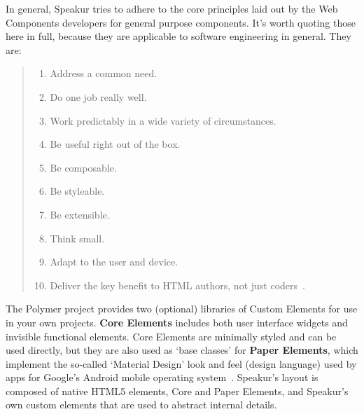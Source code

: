 In general, Speakur tries to adhere to the core principles laid out by the 
Web Components developers 
for general purpose components. 
It's worth quoting those here in full, 
because they are applicable to software engineering in general. They are:
\label{sec:wcprinciples}
\begin{quote}
\begin{enumerate}
\item Address a common need.\label{wcp:commonneed}
\item Do one job really well.\label{wcp:onejob}
\item Work predictably in a wide variety of circumstances.\label{wcp:predicatable}
\item Be useful right out of the box.\label{wcp:useful}
\item Be composable.\label{wcp:composable}
\item Be styleable.\label{wcp:stylable}
\item Be extensible.\label{wcp:extensible}
\item Think small.\label{wcp:thinksmall}
\item Adapt to the user and device.\label{wcp:adaptable}
\item Deliver the key benefit to HTML authors, not just coders~\label{wcp:htmlauthors}\cite{webcomponentscontributors2014}.
\end{enumerate}
\end{quote}


The Polymer project provides two (optional) libraries of Custom Elements for use in your own projects. 
\textbf{Core Elements} includes both user interface
widgets and invisible functional elements.
Core Elements are minimally styled and can be used directly, 
but they are also used as `base classes' for 
\textbf{Paper Elements}, 
which implement the so-called `Material Design' look and feel (design language) used by apps for Google's Android mobile operating system~\cite{imura2015}.
Speakur's layout is composed of native HTML5 elements, 
Core and Paper Elements, 
and Speakur's own custom elements that are used to abstract internal details.

